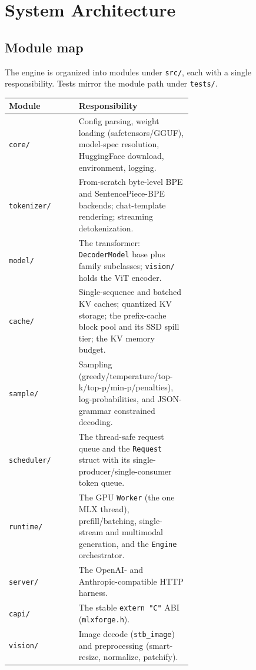 \documentclass[11pt,a4paper]{report}
\newcommand{\code}[1]{\texttt{#1}}
\begin{document}
\chapter{System Architecture}
\label{ch:arch}

\section{Module map}
The engine is organized into modules under \code{src/}, each with a single
responsibility. Tests mirror the module path under \code{tests/}.

\begin{longtable}{@{}l p{0.62\linewidth}@{}}
\toprule
Module & Responsibility \\
\midrule
\endhead
\code{core/}      & Config parsing, weight loading (safetensors/GGUF), model-spec
                    resolution, HuggingFace download, environment, logging. \\
\code{tokenizer/} & From-scratch byte-level BPE and SentencePiece-BPE backends;
                    chat-template rendering; streaming detokenization. \\
\code{model/}     & The transformer: \code{DecoderModel} base plus family
                    subclasses; \code{vision/} holds the ViT encoder. \\
\code{cache/}     & Single-sequence and batched KV caches; quantized KV storage;
                    the prefix-cache block pool and its SSD spill tier; the KV
                    memory budget. \\
\code{sample/}    & Sampling (greedy/temperature/top-k/top-p/min-p/penalties),
                    log-probabilities, and JSON-grammar constrained decoding. \\
\code{scheduler/} & The thread-safe request queue and the \code{Request} struct
                    with its single-producer/single-consumer token queue. \\
\code{runtime/}   & The GPU \code{Worker} (the one MLX thread), prefill/batching,
                    single-stream and multimodal generation, and the \code{Engine}
                    orchestrator. \\
\code{server/}    & The OpenAI- and Anthropic-compatible HTTP harness. \\
\code{capi/}      & The stable \code{extern "C"} ABI (\code{mlxforge.h}). \\
\code{vision/}    & Image decode (\code{stb\_image}) and preprocessing
                    (smart-resize, normalize, patchify). \\
\bottomrule
\end{longtable}
\end{document}
